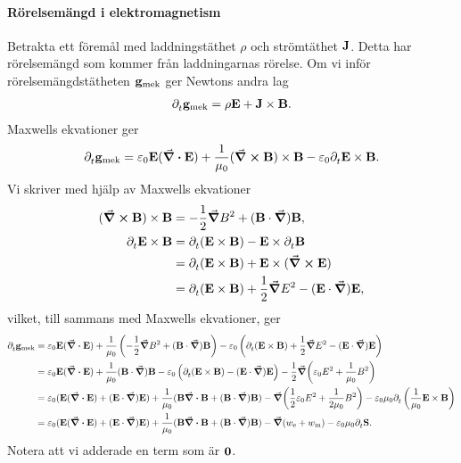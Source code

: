 \paragraph{Rörelsemängd i elektromagnetism}
Betrakta ett föremål med laddningstäthet $\rho$ och strömtäthet $\vb{J}$. Detta har rörelsemängd som kommer från laddningarnas rörelse. Om vi inför rörelsemängdstätheten $\vb{g}_{\text{mek}}$ ger Newtons andra lag
\begin{align*}
	\partial_{t}^{}\vb{g}_{\text{mek}} = \rho\vb{E} + \vb{J}\times\vb{B}.
\end{align*}
Maxwells ekvationer ger
\begin{align*}
	\partial_{t}^{}\vb{g}_{\text{mek}} = \varepsilon_{0}\vb{E}(\div{\vb{E}}) + \frac{1}{\mu_{0}}(\curl{\vb{B}})\times\vb{B} - \varepsilon_{0}\partial_{t}^{}\vb{E}\times\vb{B}.
\end{align*}
Vi skriver med hjälp av Maxwells ekvationer
\begin{align*}
	(\curl{\vb{B}})\times\vb{B} &= -\frac{1}{2}\grad{B^{2}} + (\vb{B}\cdot\grad)\vb{B}, \\
	\partial_{t}^{}\vb{E}\times\vb{B} &= \partial_{t}^{}(\vb{E}\times\vb{B}) - \vb{E}\times\partial_{t}^{}\vb{B} \\
	                            &= \partial_{t}^{}(\vb{E}\times\vb{B}) + \vb{E}\times(\curl{\vb{E}}) \\
	                            &= \partial_{t}^{}(\vb{E}\times\vb{B}) + \frac{1}{2}\grad{E^{2}} - (\vb{E}\cdot\grad)\vb{E},
\end{align*}
vilket, till sammans med Maxwells ekvationer, ger
\begin{align*}
	\partial_{t}^{}\vb{g}_{\text{mek}} &= \varepsilon_{0}\vb{E}(\div{\vb{E}}) + \frac{1}{\mu_{0}}\left(-\frac{1}{2}\grad{B^{2}} + (\vb{B}\cdot\grad)\vb{B}\right) - \varepsilon_{0}\left(\partial_{t}^{}(\vb{E}\times\vb{B}) + \frac{1}{2}\grad{E^{2}} - (\vb{E}\cdot\grad)\vb{E}\right) \\
	                             &= \varepsilon_{0}\vb{E}(\div{\vb{E}}) + \frac{1}{\mu_{0}}(\vb{B}\cdot\grad)\vb{B} - \varepsilon_{0}\left(\partial_{t}^{}(\vb{E}\times\vb{B}) - (\vb{E}\cdot\grad)\vb{E}\right) - \frac{1}{2}\grad(\varepsilon_{0}E^{2} + \frac{1}{\mu_{0}}B^{2}) \\
	                             &= \varepsilon_{0}(\vb{E}(\div{\vb{E}}) + (\vb{E}\cdot\grad)\vb{E}) + \frac{1}{\mu_{0}}(\vb{B}\div{\vb{B}} + (\vb{B}\cdot\grad)\vb{B}) - \grad(\frac{1}{2}\varepsilon_{0}E^{2} + \frac{1}{2\mu_{0}}B^{2}) - \varepsilon_{0}\mu_{0}\partial_{t}^{}\left(\frac{1}{\mu_{0}}\vb{E}\times\vb{B}\right) \\
	                             &= \varepsilon_{0}(\vb{E}(\div{\vb{E}}) + (\vb{E}\cdot\grad)\vb{E}) + \frac{1}{\mu_{0}}(\vb{B}\div{\vb{B}} + (\vb{B}\cdot\grad)\vb{B}) - \grad(w_{\text{e}} + w_{\text{m}}) - \varepsilon_{0}\mu_{0}\partial_{t}^{}\vb{S}.
\end{align*}
Notera att vi adderade en term som är $\vb{0}$.

